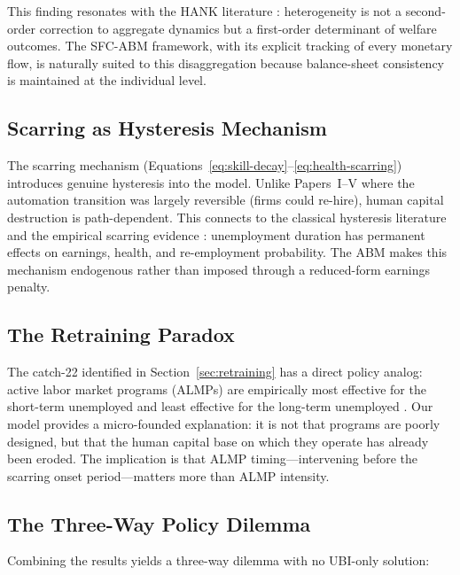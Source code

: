 \documentclass[12pt,a4paper]{article}
\begin{document}
This finding resonates with the HANK literature
\parencite{kaplan2018}: heterogeneity is not a second-order correction
to aggregate dynamics but a first-order determinant of welfare outcomes.
The SFC-ABM framework, with its explicit tracking of every monetary
flow, is naturally suited to this disaggregation because balance-sheet
consistency is maintained at the individual level.

\subsection{Scarring as Hysteresis Mechanism}

The scarring mechanism (Equations~\ref{eq:skill-decay}--\ref{eq:health-scarring})
introduces genuine hysteresis into the model. Unlike Papers~I--V where
the automation transition was largely reversible (firms could re-hire),
human capital destruction is path-dependent. This connects to the
classical hysteresis literature \parencite{blanchard1986} and the
empirical scarring evidence \parencite{arulampalam2001, jacobson1993}:
unemployment duration has permanent effects on earnings, health, and
re-employment probability. The ABM makes this mechanism endogenous rather
than imposed through a reduced-form earnings penalty.

\subsection{The Retraining Paradox}

The catch-22 identified in Section~\ref{sec:retraining} has a direct
policy analog: active labor market programs (ALMPs) are empirically
most effective for the short-term unemployed and least effective for the
long-term unemployed \parencite{card2018, heckman1999}. Our model
provides a micro-founded explanation: it is not that programs are poorly
designed, but that the human capital base on which they operate has
already been eroded. The implication is that ALMP timing---intervening
before the scarring onset period---matters more than ALMP intensity.

\subsection{The Three-Way Policy Dilemma}

Combining the results yields a three-way dilemma with no UBI-only
solution:
\end{document}
